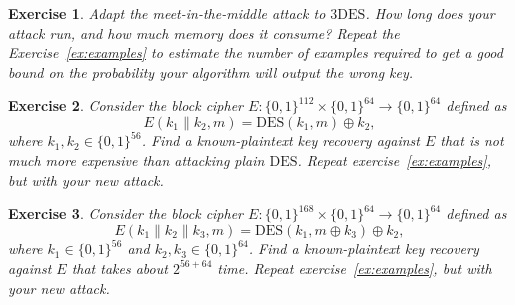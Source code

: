 \documentclass[11pt]{article}
\newtheorem{exercise}{Exercise}
\newcommand{\bits}{\{0,1\}}
\newcommand{\des}{\mathrm{DES}}
\newcommand{\threedes}{\mathrm{3DES}}
\begin{document}
\begin{exercise}
    Adapt the meet-in-the-middle attack to $\threedes$. How long does
    your attack run, and how much memory does it consume? Repeat the
    Exercise~\ref{ex:examples} to estimate the number of examples required
    to get a good bound on the probability your algorithm will output
    the wrong key.
\end{exercise}

\begin{exercise}
    Consider the block cipher $E:\bits^{112}\times\bits^{64}\to\bits^{64}$
    defined as
    \[
        E(k_1\|k_2,m) = \des(k_1,m)\oplus k_2,
    \]
    where $k_1,k_2\in\bits^{56}$. Find a known-plaintext key
    recovery against $E$ that is not much more expensive than attacking
    plain $\des$. Repeat exercise~\ref{ex:examples}, but with your new
    attack.
\end{exercise}

\begin{exercise}
    Consider the block cipher $E:\bits^{168}\times\bits^{64}\to\bits^{64}$
    defined as
    \[
        E(k_1\|k_2\|k_3,m) = \des(k_1,m\oplus k_3)\oplus k_2,
    \]
    where $k_1\in\bits^{56}$ and $k_2,k_3\in\bits^{64}$. Find a known-plaintext
    key recovery against $E$ that takes about $2^{56+64}$ time.  Repeat
    exercise~\ref{ex:examples}, but with your new attack.
\end{exercise}
\end{document}
